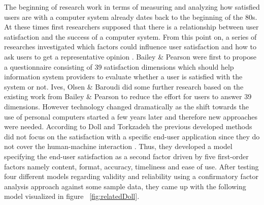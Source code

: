 The beginning of research work in terms of measuring and analyzing how satisfied users are with a computer system already dates back to the beginning of the 80s. At these times first researchers supposed that there is a relationship between user satisfaction and the success of a computer system. From this point on, a series of researches investigated which factors could influence user satisfaction and how to ask users to get a representative opinion \cite{roy1998developing}. Bailey \& Pearson were first to propose a questionnaire consisting of 39 satisfaction dimensions which should help information system providers to evaluate whether a user is satisfied with the system or not. Ives, Olsen \& Baroudi did some further research based on the existing work from Bailey \& Pearson to reduce the effort for users to answer 39 dimensions. However technology changed dramatically as the shift towards the use of personal computers started a few years later and therefore new approaches were needed. According to Doll and Torkzadeh the previous developed methods did not focus on the satisfaction with a specific end-user application since they do not cover the human-machine interaction \cite{roy1998developing}. Thus, they developed a model specifying the end-user satisfaction as a second factor driven by five first-order factors namely content, format, accuracy, timeliness and ease of use. After testing four different models regarding validity and reliability using a confirmatory factor analysis approach against some sample data, they came up with the following model visualized in figure ~\ref{fig:relatedDoll}. 

